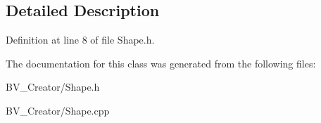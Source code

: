 \subsection{Detailed Description}


Definition at line 8 of file Shape.h.

The documentation for this class was generated from the following files:\begin{DoxyCompactItemize}
\item 
BV\_\-Creator/Shape.h\item 
BV\_\-Creator/Shape.cpp\end{DoxyCompactItemize}
